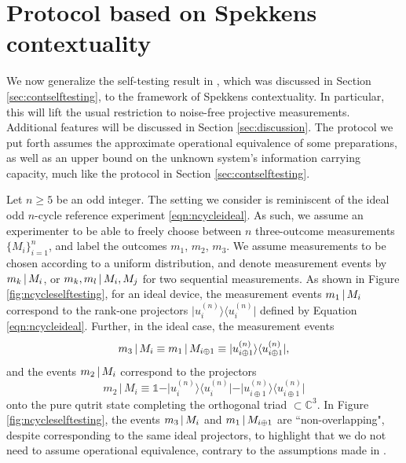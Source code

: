 \chapter{Protocol based on Spekkens contextuality}
\label{sec:protocols}
We now generalize the self-testing result in \cite{Bharti2019}, which was discussed in Section \ref{sec:contselftesting}, to the framework of Spekkens contextuality. In particular, this will lift the usual restriction to noise-free projective measurements. Additional features will be discussed in Section \ref{sec:discussion}. The protocol we put forth assumes the approximate operational equivalence of some preparations, as well as an upper bound on the unknown system's information carrying capacity, much like the protocol in Section \ref{sec:contselftesting}.

Let $n\geq 5$ be an odd integer. The setting we consider is reminiscent of the ideal odd $n$-cycle reference experiment \ref{eqn:ncycleideal}. As such, we assume an experimenter to be able to freely choose between $n$ three-outcome measurements $\{M_i\}_{i=1}^n$, and label the outcomes $m_1$, $m_2$, $m_3$. We assume measurements to be chosen according to a uniform distribution, and denote measurement events by  $m_k\thinspace\vert\thinspace M_i$, or $m_k,m_l\thinspace\vert\thinspace M_i,M_j$ for two sequential measurements. As shown in Figure \ref{fig:ncycleselftesting}, for an ideal device, the measurement events $m_1 \thinspace\vert\thinspace M_i$ correspond to the rank-one projectors $\vert u_i^{(n)}\rangle\langle u_i^{(n)}\vert$ defined by Equation \ref{eqn:ncycleideal}. Further, in the ideal case, the measurement events \begin{equation*}
m_3\thinspace\vert\thinspace M_i\equiv m_1\thinspace\vert\thinspace M_{i\oplus 1}\equiv\vert u_{i\oplus 1}^{(n)}\rangle\langle u_{i\oplus 1}^{(n)}\vert,
\end{equation*}and the events $m_2\thinspace\vert\thinspace M_i$ correspond to the projectors 
\begin{equation*}
m_2\,\vert\,M_i\equiv \mathbb{1}-\vert u_i^{(n)}\rangle\langle u_i^{(n)}\vert-\vert u_{i\oplus 1}^{(n)}\rangle\langle u_{i\oplus 1}^{(n)}\vert
\end{equation*} onto the pure qutrit state completing the orthogonal triad $\subset \mathbb{C}^3$. In Figure \ref{fig:ncycleselftesting}, the events $m_3\thinspace \vert\thinspace M_i$ and $m_1\thinspace\vert\thinspace M_{i\oplus 1}$ are ``non-overlapping", despite corresponding to the same ideal projectors, to highlight that we do not need to assume operational equivalence, contrary to the assumptions made in \cite{Kunjwal2019}.

